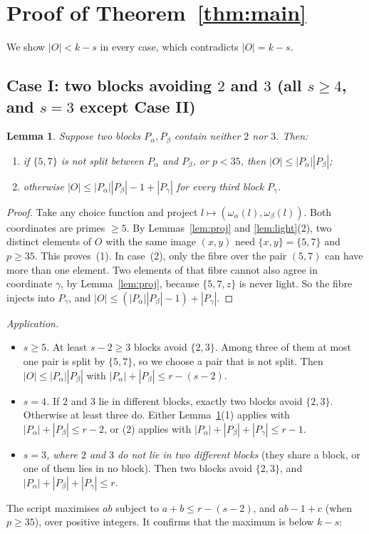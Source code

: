 \documentclass[11pt]{article}
\newtheorem{lemma}[theorem]{Lemma}
\theoremstyle{definition}
\theoremstyle{remark}
\begin{document}
\section{Proof of Theorem~\ref{thm:main}}

We show $|O|<k-s$ in every case, which contradicts $|O|=k-s$.

\subsection*{Case I: two blocks avoiding $2$ and $3$ (all $s\ge4$, and $s=3$ except Case II)}

\begin{lemma}\label{lem:caseI}
Suppose two blocks $P_\alpha,P_\beta$ contain neither $2$ nor $3$. Then:
\begin{enumerate}
\item if $\{5,7\}$ is not split between $P_\alpha$ and $P_\beta$, or $p<35$, then
  $|O|\le|P_\alpha||P_\beta|$;
\item otherwise $|O|\le|P_\alpha||P_\beta|-1+|P_\gamma|$ for every third block $P_\gamma$.
\end{enumerate}
\end{lemma}
\begin{proof}
Take any choice function and project $l\mapsto(\omega_\alpha(l),\omega_\beta(l))$. Both
coordinates are primes $\ge5$. By Lemmas~\ref{lem:proj} and \ref{lem:light}(2), two distinct
elements of $O$ with the same image $(x,y)$ need $\{x,y\}=\{5,7\}$ and $p\ge35$. This proves~(1).
In case~(2), only the fibre over the pair $(5,7)$ can have more than one element. Two elements
of that fibre cannot also agree in coordinate $\gamma$, by Lemma~\ref{lem:proj}, because
$\{5,7,z\}$ is never light. So the fibre injects into $P_\gamma$, and
$|O|\le(|P_\alpha||P_\beta|-1)+|P_\gamma|$.
\end{proof}

\emph{Application.}
\begin{itemize}
\item \emph{$s\ge5$.} At least $s-2\ge3$ blocks avoid $\{2,3\}$. Among three of them at most one
  pair is split by $\{5,7\}$, so we choose a pair that is not split. Then
  $|O|\le|P_\alpha||P_\beta|$ with $|P_\alpha|+|P_\beta|\le r-(s-2)$.
\item \emph{$s=4$.} If $2$ and $3$ lie in different blocks, exactly two blocks avoid $\{2,3\}$.
  Otherwise at least three do. Either Lemma~\ref{lem:caseI}(1) applies with
  $|P_\alpha|+|P_\beta|\le r-2$, or (2) applies with $|P_\alpha|+|P_\beta|+|P_\gamma|\le r-1$.
\item \emph{$s=3$, where $2$ and $3$ do not lie in two different blocks} (they share a block,
  or one of them lies in no block). Then two blocks avoid $\{2,3\}$, and
  $|P_\alpha|+|P_\beta|+|P_\gamma|\le r$.
\end{itemize}
The script maximises $ab$ subject to $a+b\le r-(s-2)$, and $ab-1+c$ (when $p\ge35$), over
positive integers. It confirms that the maximum is below $k-s$:
\end{document}

